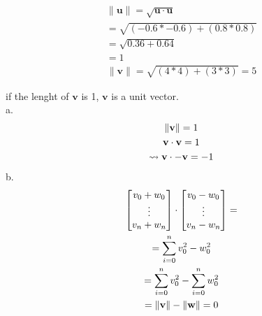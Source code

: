 \documentclass{report}
\begin{document}
\begin{question}{2}{}
    \begin{gather*}
        \lVert \mathbf{u} \rVert = \sqrt{\mathbf{u} \cdot \mathbf{u}} \\
        = \sqrt{(-0.6 * -0.6) + (0.8 * 0.8)} \\
        = \sqrt{0.36 + 0.64} \\
        = 1
    \end{gather*}
    \begin{gather*}
        \lVert \mathbf{v} \rVert = \sqrt{(4*4) + (3 * 3)} = 5
    \end{gather*}
\end{question}

\begin{question}{4}{}
    if the lenght of $\mathbf{v}$ is 1, $\mathbf{v}$ is a unit vector.\\
    a.
    \begin{gather*}
        \lVert \mathbf{v} \rVert = 1 \\
        \mathbf{v} \cdot \mathbf{v} = 1 \\
        \leadsto \mathbf{v} \cdot \mathbf{-v} = -1
    \end{gather*}
    b.
    \begin{gather*}
        \begin{bmatrix}
            v_0 + w_0\\
            \vdots \\
            v_n + w_n\\
        \end{bmatrix} \cdot
        \begin{bmatrix}
            v_0 - w_0\\
            \vdots \\
            v_n - w_n\\
        \end{bmatrix} = \\
        = \sum_{i = 0}^{n} { v_0^2 - w_0^2 } \\
        = \sum_{i = 0}^{n} { v_0^2 } - \sum_{i = 0}^{n} {
        w_0^2 } \\
        = \lVert \mathbf{v} \rVert - \lVert \mathbf{w} \rVert = 0
    \end{gather*}
\end{question}
\end{document}
